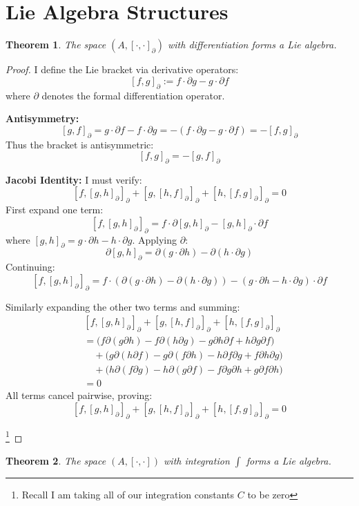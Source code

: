 \documentclass{artjlt}
\newtheorem{thm}{Theorem}
\newcommand{\?}{\textbackslash}
\begin{document}
\section{Lie Algebra Structures}
   \begin{thm}
The space $(A, [\cdot,\cdot]_\partial)$ with differentiation forms a Lie algebra.
\end{thm}
\begin{proof}
I define the Lie bracket via derivative operators:
\[
[f,g]_\partial := f \cdot \partial g - g \cdot \partial f 
\]
where $\partial$ denotes the formal differentiation operator.

\noindent\textbf{Antisymmetry:}
\[
[g,f]_\partial = g \cdot \partial f - f \cdot \partial g = - (f \cdot \partial g - g \cdot \partial f) = -[f,g]_\partial
\]
Thus the bracket is antisymmetric:
\[
\boxed{[f,g]_\partial = -[g,f]_\partial} 
\]

\noindent\textbf{Jacobi Identity:}
I must verify:
\[
[f,[g,h]_\partial]_\partial + [g,[h,f]_\partial]_\partial + [h,[f,g]_\partial]_\partial = 0
\]
First expand one term:
\[
[f,[g,h]_\partial]_\partial = f \cdot \partial[g,h]_\partial - [g,h]_\partial \cdot \partial f
\]
where $[g,h]_\partial = g \cdot \partial h - h \cdot \partial g$. Applying $\partial$:
\[
\partial[g,h]_\partial = \partial(g \cdot \partial h) - \partial(h \cdot \partial g)
\]
Continuing:
\[
[f,[g,h]_\partial]_\partial = f \cdot (\partial(g \cdot \partial h) - \partial(h \cdot \partial g)) - (g \cdot \partial h - h \cdot \partial g) \cdot \partial f
\]

Similarly expanding the other two terms and summing:
\[
\begin{aligned}
&[f,[g,h]_\partial]_\partial + [g,[h,f]_\partial]_\partial + [h,[f,g]_\partial]_\partial \\
&= \big(f \partial(g \partial h) - f \partial(h \partial g) - g \partial h \partial f + h \partial g \partial f\big) \\
&\quad + \big(g \partial(h \partial f) - g \partial(f \partial h) - h \partial f \partial g + f \partial h \partial g\big) \\
&\quad + \big(h \partial(f \partial g) - h \partial(g \partial f) - f \partial g \partial h + g \partial f \partial h\big) \\
&= 0
\end{aligned}
\]
All terms cancel pairwise, proving:
\[
\boxed{[f,[g,h]_\partial]_\partial + [g,[h,f]_\partial]_\partial + [h,[f,g]_\partial]_\partial = 0}
\]

\footnote{Recall I am taking all of our integration constants $C$ to be zero}
\end{proof}
\begin{thm}
The space $(A, [\cdot,\cdot])$ with integration $\int$ forms a Lie algebra.
\end{thm}
\end{document}
